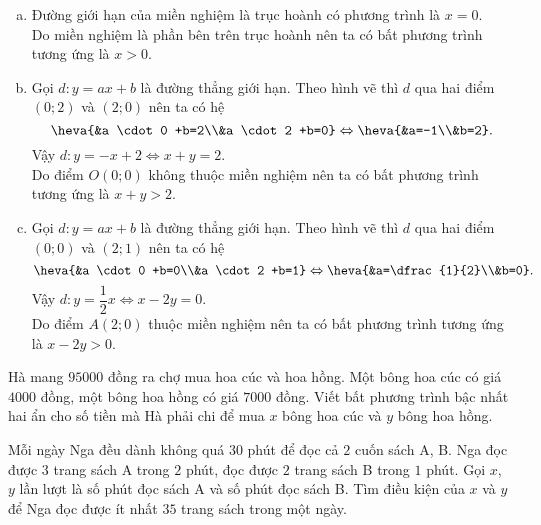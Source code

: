 \begin{baitap}
\begin{enumerate}[a)]
	\item Đường giới hạn của miền nghiệm là trục hoành có phương trình là $x=0$.\\
	Do miền nghiệm là phần bên trên trục hoành nên ta có bất phương trình tương ứng là $x>0$.
	\item Gọi $d \colon y =ax+b$ là đường thẳng giới hạn. Theo hình vẽ thì $d$ qua hai điểm $(0;2)$ và $(2;0)$ nên ta có hệ
	$$\heva{&a \cdot 0 +b=2\\&a \cdot 2 +b=0} \Leftrightarrow \heva{&a=-1\\&b=2}.$$
	Vậy $d \colon y=-x+2 \Leftrightarrow x+y=2$.\\
	Do điểm $O(0;0)$ không thuộc miền nghiệm nên ta có bất phương trình tương ứng là $x+y>2$.
	\item Gọi $d \colon y =ax+b$ là đường thẳng giới hạn. Theo hình vẽ thì $d$ qua hai điểm $(0;0)$ và $(2;1)$ nên ta có hệ
	$$\heva{&a \cdot 0 +b=0\\&a \cdot 2 +b=1} \Leftrightarrow \heva{&a=\dfrac{1}{2}\\&b=0}.$$
	Vậy $d \colon y=\dfrac{1}{2}x \Leftrightarrow x-2y=0$.\\
	Do điểm $A(2;0)$ thuộc miền nghiệm nên ta có bất phương trình tương ứng là $x-2y>0$.
\end{enumerate}
\end{baitap}

\begin{baitap}%
	Hà mang $95000$ đồng ra chợ mua hoa cúc và hoa hồng. Một bông hoa cúc có giá $4000$ đồng, một bông hoa hồng có giá $7000$ đồng. Viết bất phương trình bậc nhất hai ẩn cho số tiền mà Hà phải chi để mua $x$ bông hoa cúc và $y$ bông hoa hồng.  
\end{baitap}

\begin{baitap}%
	Mỗi ngày Nga đều dành không quá $30$ phút để đọc cả $2$ cuốn sách A, B. Nga đọc được $3$ trang sách A trong $2$ phút, đọc được $2$ trang sách B trong $1$ phút. Gọi $x$, $y$ lần lượt là số phút đọc sách A và số phút đọc sách B. Tìm điều kiện của $x$ và $y$ để Nga đọc được ít nhất $35$ trang sách trong một ngày.
\end{baitap}

